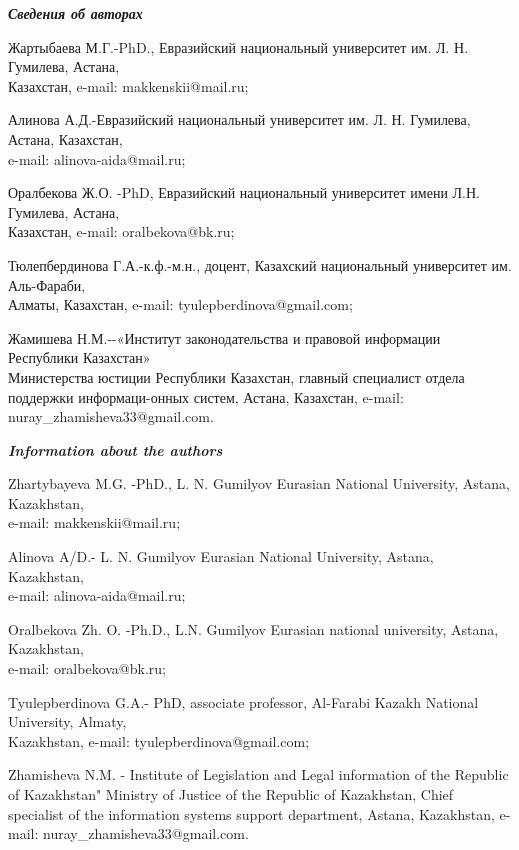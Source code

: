\emph{{\bfseries Сведения об авторах}}
\begin{noparindent}

Жартыбаева М.Г.-PhD., Евразийский национальный университет им. Л. Н.
Гумилева, Астана,\\Казахстан, e-mail: makkenskii@mail.ru;

Алинова А.Д.-Евразийский национальный университет им. Л. Н. Гумилева,
Астана, Казахстан,\\ e-mail: alinova-aida@mail.ru;

Оралбекова Ж.О. -PhD, Евразийский национальный университет имени Л.Н.
Гумилева, Астана, \\Казахстан, e-mail: oralbekova@bk.ru;

Тюлепбердинова Г.А.-к.ф.-м.н., доцент, Казахский национальный
университет им. Аль-Фараби,\\ Алматы, Казахстан, e-mail:
tyulepberdinova@gmail.com;

Жамишева Н.М.-\/-«Институт законодательства и правовой информации
Республики Казахстан»\\ Министерства юстиции Республики Казахстан, главный
специалист отдела поддержки информаци-онных систем, Астана, Казахстан,
e-mail: nuray\_zhamisheva33@gmail.com.
\end{noparindent}

\emph{{\bfseries Information about the authors}}
\begin{noparindent}

Zhartybayeva M.G. -PhD., L. N. Gumilyov Eurasian National University,
Astana, Kazakhstan, \\e-mail: makkenskii@mail.ru;

Alinova A/D.- L. N. Gumilyov Eurasian National University, Astana,
Kazakhstan, \\e-mail: alinova-aida@mail.ru;

Oralbekova Zh. O. -Ph.D., L.N. Gumilyov Eurasian national university,
Astana, Kazakhstan, \\e-mail: oralbekova@bk.ru;

Tyulepberdinova G.A.- PhD, associate professor, Al-Farabi Kazakh
National University, Almaty, \\Kazakhstan, e-mail:
tyulepberdinova@gmail.com;

Zhamisheva N.M. - Institute of Legislation and Legal information of the
Republic of Kazakhstan" Ministry of Justice of the Republic of
Kazakhstan, Chief specialist of the information systems support
department, Astana, Kazakhstan, e-mail: nuray\_zhamisheva33@gmail.com.


\end{noparindent}


